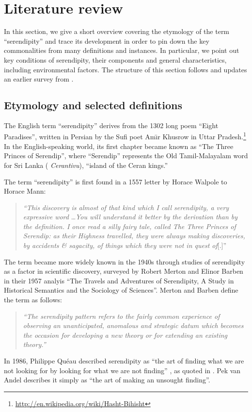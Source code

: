 \section{Literature review} \label{sec:literature-review}

In this section, we give a short overview covering the etymology of
the term ``serendipity'' and trace its development in order to pin
down the key commonalities from many definitions and instances.  In
particular, we point out key conditions of serendipity, their
components and general characteristics, including environmental
factors.  The structure of this section follows and updates an earlier
survey from .

\subsection{Etymology and selected definitions} \label{sec:overview-serendipity}
The English term ``serendipity'' derives from the 1302 long poem ``Eight Paradises'', written in Persian by the Sufi poet Am\={\i}r Khusrow in Uttar Pradesh.\footnote{\url{http://en.wikipedia.org/wiki/Hasht-Bihisht}}  In the English-speaking world, its first chapter became known as ``The Three Princes of Serendip'', where ``Serendip'' represents the Old Tamil-Malayalam word for Sri Lanka (%
\emph{Cerantivu}), ``island of the Ceran kings.''

The term ``serendipity'' is first found in a 1557 letter by Horace Walpole to Horace Mann:
\begin{quote}
\emph{``This discovery is almost of that kind which I call serendipity, a very expressive
word} \ldots \emph{You will understand it better by the derivation than by the
definition. I once read a silly fairy tale, called The Three Princes of Serendip:
as their Highness travelled, they were always making discoveries, by accidents
\& sagacity, of things which they were not in quest of}[.]''~\cite[p. 633]{van1994anatomy}
\end{quote}
The term became more widely known in the 1940s through studies of serendipity as a factor in scientific discovery, surveyed by Robert Merton and Elinor Barben \citeyear{merton} in their 1957 analyis ``The Travels and Adventures of Serendipity, A Study in Historical Semantics and the Sociology of Sciences''.  Merton and Barben define the term as follows:
\begin{quote}
\emph{``The serendipity pattern refers to the fairly common experience of observing
an unanticipated, anomalous and strategic datum which becomes the occasion
for developing a new theory or for extending an existing theory.''} \cite[p. 635]{van1994anatomy}
\end{quote}
In 1986, Philippe Qu\'eau described serendipity as ``the art of
finding what we are not looking for by looking for what we are not
finding'' \cite{eloge-de-la-simulation}, as quoted in
\cite[p. 121]{Campos2002}.  Pek van Andel
\citeyear[p. 631]{van1994anatomy} describes it simply as ``the art of
making an unsought finding''.


